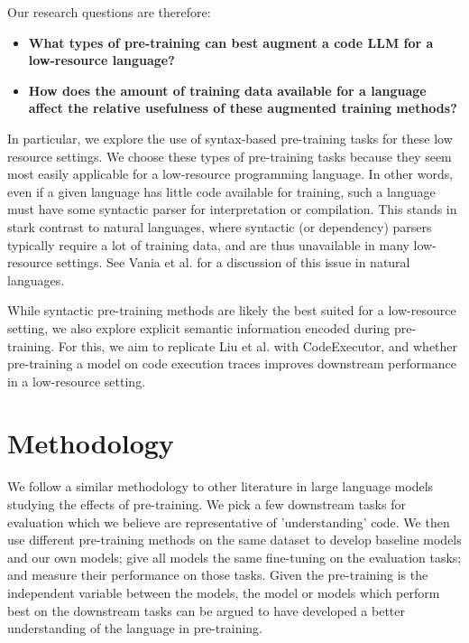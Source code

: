 \documentclass[acmlarge]{acmart}
\begin{document}
Our research questions are therefore:

\begin{itemize}
    \item \textbf{What types of pre-training can best augment a code LLM for a low-resource language?}
    \item \textbf{How does the amount of training data available for a language affect the relative usefulness of these augmented training methods?}
\end{itemize}

In particular, we explore the use of syntax-based pre-training tasks for these low resource settings. We choose these types of pre-training tasks because they seem most easily applicable  for a low-resource programming language. In other words, even if a given language has little code available for training, such a language must have some syntactic parser for interpretation or compilation. This stands in stark contrast to natural languages, where syntactic (or dependency) parsers typically require a lot of training data, and are thus unavailable in many low-resource settings. See Vania et al. \cite{vania-low-resource-parsers} for a discussion of this issue in natural languages.

While syntactic pre-training methods are likely the best suited for a low-resource setting, we also explore explicit semantic information encoded during pre-training. For this, we aim to replicate Liu et al. \cite{liu2023code} with CodeExecutor, and whether pre-training a model on code execution traces improves downstream performance in a low-resource setting.

\section{Methodology}

We follow a similar methodology to other literature in large language models studying the effects of pre-training. We pick a few downstream tasks for evaluation which we believe are representative of 'understanding' code. We then use different pre-training methods on the same dataset to develop baseline models and our own models; give all models the same fine-tuning on the evaluation tasks; and measure their performance on those tasks. Given the pre-training is the independent variable between the models, the model or models which perform best on the downstream tasks can be argued to have developed a better understanding of the language in pre-training.
\end{document}

